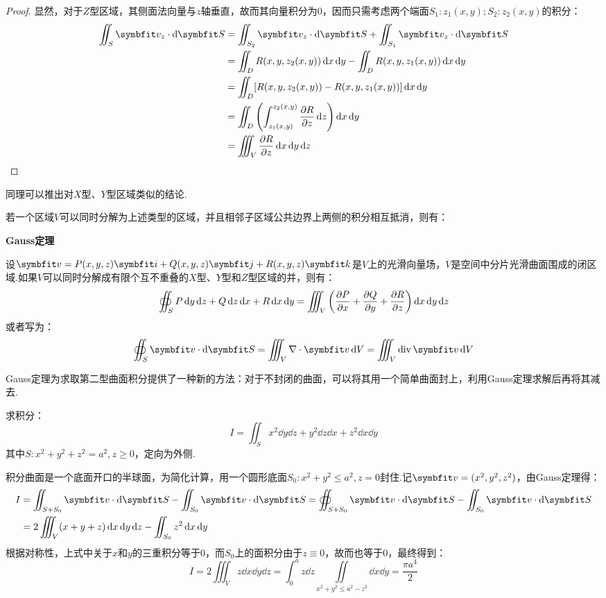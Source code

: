 \begin{proof}
    显然，对于$Z$型区域，其侧面法向量与$z$轴垂直，故而其向量积分为$0$，因而只需考虑两个端面$S_1:z_1(x,y);S_2:z_2(x,y)$的积分：
    \begin{align*}
        \iint_S \vb{v}_z\cdot\dd{\vb{S}} &= \iint_{S_2}\vb{v}_z\cdot\dd{\vb{S}} + \iint_{S_1}\vb{v}_z\cdot\dd{\vb{S}} \\
        &= \iint_DR(x,y,z_2(x,y))\dd{x}\dd{y} - \iint_DR(x,y,z_1(x,y))\dd{x}\dd{y}\\
        &= \iint_D[R(x,y,z_2(x,y))-R(x,y,z_1(x,y))]\dd{x}\dd{y}\\
        &= \iint_D\left(\int_{z_1(x,y)}^{z_2(x,y)}\pdv{R}{z}\dd{z}\right)\dd{x}\dd{y}\\
        &= \iiint_V \pdv{R}{z}\dd{x}\dd{y}\dd{z}
    \end{align*}
\end{proof}
同理可以推出对$X$型、$Y$型区域类似的结论.

若一个区域$V$可以同时分解为上述类型的区域，并且相邻子区域公共边界上两侧的积分相互抵消，则有：
\begin{theorem}
    \textbf{Gauss定理}
    \label{thm:GaussTheorem}

    设$\vb{v} = P(x,y,z)\vb{i} + Q(x,y,z)\vb{j} + R(x,y,z)\vb{k}$是$V$上的光滑向量场，$V$是空间中分片光滑曲面围成的闭区域.如果$V$可以同时分解成有限个互不重叠的$X$型、$Y$型和$Z$型区域的并，则有：
    \[\oiint_S P\dd{y}\dd{z} + Q\dd{z}\dd{x} + R\dd{x}\dd{y} = \iiint_V\left(\pdv{P}{x}+\pdv{Q}{y}+\pdv{R}{z}\right)\dd{x}\dd{y}\dd{z}\]
    或者写为：
    \[\oiint_S \vb{v}\cdot\dd{\vb{S}} = \iiint_V\nabla\cdot\vb{v}\dd{V} = \iiint_V\operatorname{div}\vb{v}\dd{V}\]
\end{theorem}

Gauss定理为求取第二型曲面积分提供了一种新的方法：对于不封闭的曲面，可以将其用一个简单曲面封上，利用Gauss定理求解后再将其减去.

\begin{question}
    求积分：
    \[I = \iint_S x^2\dd{y}\dd{z} + y^2\dd{z}\dd{x} + z^2\dd{x}\dd{y}\]
    其中$S:x^2+y^2+z^2 = a^2,z\geqslant0$，定向为外侧.
\end{question}

\begin{solution}
    积分曲面是一个底面开口的半球面，为简化计算，用一个圆形底面$S_0:x^2+y^2\leqslant a^2,z=0$封住.记$\vb{v} = (x^2,y^2,z^2)$，由Gauss定理得：
    \begin{align*}
        I &= \iint_{S+S_0}\vb{v}\cdot\dd{\vb{S}} - \iint_{S_0}\vb{v}\cdot\dd{\vb{S}} = \oiint_{S+S_0}\vb{v}\cdot\dd{\vb{S}} - \iint_{S_0}\vb{v}\cdot\dd{\vb{S}}\\
        &= 2\iiint_V (x+y+z)\dd{x}\dd{y}\dd{z} - \iint_{S_0}z^2\dd{x}\dd{y}
    \end{align*}
    根据对称性，上式中关于$x$和$y$的三重积分等于$0$，而$S_0$上的面积分由于$z\equiv0$，故而也等于$0$，最终得到：
    \[I = 2\iiint_V z\dd{x}\dd{y}\dd{z} = \int_{0}^{a}z\dd{z}\underset{x^2+y^2\leqslant a^2-z^2}{\iint}\dd{x}\dd{y} = \frac{\pi a^4}{2}\]
\end{solution}


